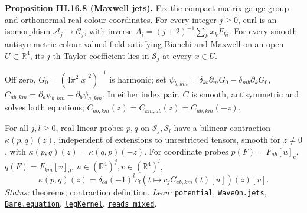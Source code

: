 \documentclass[
  letterpaper,
  11pt]{article}
\begin{document}
\textbf{Proposition III.16.8 (Maxwell jets).} Fix the compact matrix
gauge group and orthonormal real colour coordinates. For every integer
\(j\ge0\), curl is an isomorphism \(\mathcal A_j\to\mathcal C_j\), with
inverse \(A_i=(j+2)^{-1}\sum_kx_kF_{ki}\). For every smooth
antisymmetric colour-valued field satisfying Bianchi and Maxwell on an
open \(U\subset\mathbb R^4\), its \(j\)-th Taylor coefficient lies in
\(\mathcal S_j\) at every \(x\in U\).

Off zero, \(G_0=(4\pi^2|x|^2)^{-1}\) is harmonic; set
\(\psi_{b,km}=\delta_{kb}\partial_mG_0-\delta_{mb}\partial_kG_0\),
\(C_{ab,km}=\partial_a\psi_{b,km}-\partial_b\psi_{a,km}\). In either
index pair, \(C\) is smooth, antisymmetric and solves both equations;
\(C_{ab,km}(z)=C_{km,ab}(z)=C_{ab,km}(-z)\).

For all \(j,l\ge0\), real linear probes \(p,q\) on
\(\mathcal S_j,\mathcal S_l\) have a bilinear contraction
\(\kappa(p,q)(z)\), independent of extensions to unrestricted tensors,
smooth for \(z\ne0\), with \(\kappa(p,q)(z)=\kappa(q,p)(-z)\). For
coordinate probes \(p(F)=F_{ab}[u]_c\), \(q(F)=F_{km}[v]_d\),
\(u\in(\mathbb R^4)^j,v\in(\mathbb R^4)^l\),
\[\kappa(p,q)(z)=\delta_{cd}(-1)^lc_l(t\mapsto c_jC_{ab,km}(t)[u])(z)[v].\]
\emph{Status:} theorems; contraction definition. \emph{Lean:}
\href{https://github.com/yang-mills-group/OpenAI-YM-20261028/blob/3456e5e75cf8d4cd558955a5c7638fba2d68f464/YM/Maxwell/Exterior.lean\#L218-L224}{\texttt{potential}},
\href{https://github.com/yang-mills-group/OpenAI-YM-20261028/blob/3456e5e75cf8d4cd558955a5c7638fba2d68f464/YM/Maxwell/Shell.lean\#L73-L122}{\texttt{WaveOn.jets}},
\href{https://github.com/yang-mills-group/OpenAI-YM-20261028/blob/3456e5e75cf8d4cd558955a5c7638fba2d68f464/YM/Maxwell/Curls.lean\#L82-L98}{\texttt{Bare.equation}},
\href{https://github.com/yang-mills-group/OpenAI-YM-20261028/blob/3456e5e75cf8d4cd558955a5c7638fba2d68f464/YM/Maxwell/Leg.lean\#L161-L162}{\texttt{legKernel}},
\href{https://github.com/yang-mills-group/OpenAI-YM-20261028/blob/3456e5e75cf8d4cd558955a5c7638fba2d68f464/YM/Maxwell/Bilinear.lean\#L90-L105}{\texttt{reads\_mixed}}.
\end{document}
